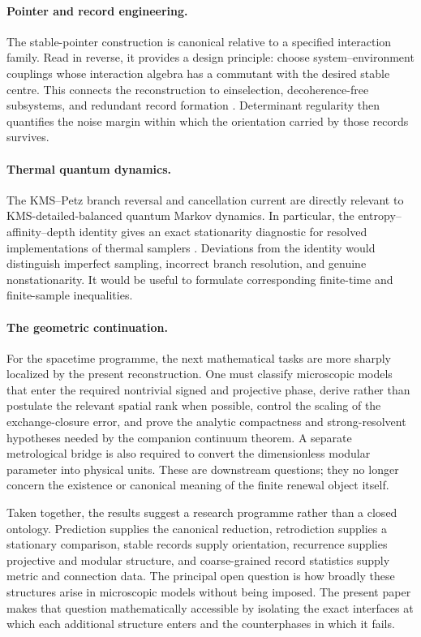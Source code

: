 \documentclass[11pt]{article}
\theoremstyle{definition}
\theoremstyle{remark}
\begin{document}
\paragraph{Pointer and record engineering.}
The stable-pointer construction is canonical relative to a specified
interaction family.  Read in reverse, it provides a design principle: choose
system--environment couplings whose interaction algebra has a commutant with
the desired stable centre.  This connects the reconstruction to einselection,
decoherence-free subsystems, and redundant record formation
\cite{Zurek1981,Zurek2003,Schlosshauer2004,BlanchardOlkiewicz2003,
Evans1977,FrigerioVerri1982,FagnolaSassoUmanita2019,TicozziViola2008,
BlumeKohoutZurek2006}.  Determinant regularity then quantifies the noise margin
within which the orientation carried by those records survives.

\paragraph{Thermal quantum dynamics.}
The KMS--Petz branch reversal and cancellation current are directly relevant to
KMS-detailed-balanced quantum Markov dynamics.  In particular, the
entropy--affinity--depth identity gives an exact stationarity diagnostic for
resolved implementations of thermal samplers
\cite{FagnolaUmanita2010,ChenKastoryanoGilyen2023}.  Deviations from the identity
would distinguish imperfect sampling, incorrect branch resolution, and genuine
nonstationarity.  It would be useful to formulate corresponding finite-time and
finite-sample inequalities.

\paragraph{The geometric continuation.}
For the spacetime programme, the next mathematical tasks are more sharply
localized by the present reconstruction.  One must classify microscopic models
that enter the required nontrivial signed and projective phase, derive rather
than postulate the relevant spatial rank when possible, control the scaling of
the exchange-closure error, and prove the analytic compactness and
strong-resolvent hypotheses needed by the companion continuum theorem.  A
separate metrological bridge is also required to convert the dimensionless
modular parameter into physical units.  These are downstream questions; they
no longer concern the existence or canonical meaning of the finite renewal
object itself.

Taken together, the results suggest a research programme rather than a closed
ontology.  Prediction supplies the canonical reduction, retrodiction supplies
a stationary comparison, stable records supply orientation, recurrence supplies
projective and modular structure, and coarse-grained record statistics supply
metric and connection data.  The principal open question is how broadly these
structures arise in microscopic models without being imposed.  The present
paper makes that question mathematically accessible by isolating the exact
interfaces at which each additional structure enters and the counterphases in
which it fails.
\end{document}
